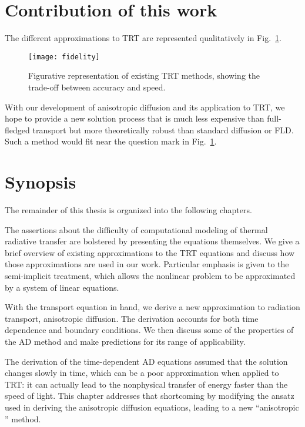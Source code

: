 \section{Contribution of this work}

The different approximations to TRT are represented qualitatively in
Fig.~\ref{fig:fidelity}.

\begin{figure}[htb]
  \centering
  \texttt{[image: fidelity]}
  \caption{Figurative representation of existing TRT methods, showing the
  trade-off between accuracy and speed.}
  \label{fig:fidelity}
\end{figure}

With our development of anisotropic diffusion and its application to TRT, we
hope to provide a new solution process that is much less expensive than
full-fledged transport but more theoretically robust than standard diffusion or
FLD. Such a method would fit near the question mark in
Fig.~\ref{fig:fidelity}.

\section{Synopsis}

The remainder of this thesis is organized into the following chapters.

The assertions about the difficulty of computational modeling of thermal
radiative transfer are bolstered by presenting the equations themselves. We give
a brief overview of existing approximations to the TRT equations and discuss how
those approximations are used in our work. Particular emphasis is given to the
semi-implicit treatment, which allows the nonlinear problem to be approximated
by a system of linear equations.

With the transport equation in hand, we derive a new approximation to radiation
transport, anisotropic diffusion. The derivation accounts for both time
dependence and boundary conditions. We then discuss some of the properties of
the AD method and make predictions for its range of applicability.

The derivation of the time-dependent AD equations assumed that the solution
changes slowly in time, which can be a poor approximation when applied to
TRT: it can actually lead to the nonphysical transfer of energy faster than the
speed of
light. This chapter addresses that shortcoming by modifying the ansatz used in
deriving the anisotropic diffusion equations, leading to a new ``anisotropic
\Pone'' method.

